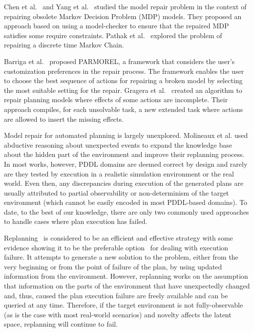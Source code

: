 \documentclass[letterpaper]{article} %
\begin{document}
Chen et al.~ and Yang et al.~ studied the model repair problem in the context of repairing obsolete Markov Decision Problem (MDP) models. They proposed an approach based on using a model-checker to ensure that the repaired MDP satisfies some require constraints. Pathak et al.~ explored the problem of repairing a discrete time Markov Chain.

Barriga et al.~ proposed PARMOREL, a framework that considers the user's customization preferences in the repair process. The framework enables the user to choose the best sequence of actions for repairing a broken model by selecting the most suitable setting for the repair.
Gragera et al.~ created an algorithm to repair planning models where effects of some actions are incomplete. Their approach compiles, for each unsolvable task, a new extended task where actions are allowed to insert the missing effects.

Model repair for automated planning is largely unexplored. Molineaux et al. used abductive reasoning about unexpected events to expand the knowledge base about the hidden part of the environment and improve their replanning process. In most works, however, PDDL domains are deemed correct by design and rarely are they tested by execution in a realistic simulation environment or the real world. Even then, any discrepancies during execution of the generated plans are usually attributed to partial observability or non-determinism of the target environment (which cannot be easily encoded in most PDDL-based domains). To date, to the best of our knowledge, there are only two commonly used approaches to handle cases where plan execution has failed.

Replanning~\cite{cushing2005replanning, bezrucav2022towards} is considered to be an efficient and effective strategy with some evidence showing it to be the preferable option~\cite{nebel1995plan} for dealing with execution failure. It attempts to generate a new solution to the problem, either from the very beginning or from the point of failure of the plan, by using updated information from the environment. However, replanning works on the assumption that information on the parts of the environment that have unexpectedly changed and, thus, caused the plan execution failure are freely available and can be queried at any time. Therefore, if the target environment is not fully-observable (as is the case with most real-world scenarios) and novelty affects the latent space, replanning will continue to fail.
\end{document}
